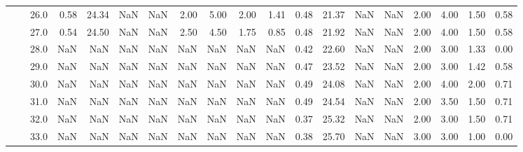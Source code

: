 \begin{tabular}{lllrrrrrrrrrrrrrrrr}
      &     & 26.0 &      0.58 &      24.34 &               NaN &                NaN & 2.00 &   5.00 &             2.00 &                         1.41 &      0.48 &      21.37 &               NaN &                NaN & 2.00 &   4.00 &             1.50 &                         0.58 \\
      &     & 27.0 &      0.54 &      24.50 &               NaN &                NaN & 2.50 &   4.50 &             1.75 &                         0.85 &      0.48 &      21.92 &               NaN &                NaN & 2.00 &   4.00 &             1.50 &                         0.58 \\
      &     & 28.0 &       NaN &        NaN &               NaN &                NaN &  NaN &    NaN &              NaN &                          NaN &      0.42 &      22.60 &               NaN &                NaN & 2.00 &   3.00 &             1.33 &                         0.00 \\
      &     & 29.0 &       NaN &        NaN &               NaN &                NaN &  NaN &    NaN &              NaN &                          NaN &      0.47 &      23.52 &               NaN &                NaN & 2.00 &   3.00 &             1.42 &                         0.58 \\
      &     & 30.0 &       NaN &        NaN &               NaN &                NaN &  NaN &    NaN &              NaN &                          NaN &      0.49 &      24.08 &               NaN &                NaN & 2.00 &   4.00 &             2.00 &                         0.71 \\
      &     & 31.0 &       NaN &        NaN &               NaN &                NaN &  NaN &    NaN &              NaN &                          NaN &      0.49 &      24.54 &               NaN &                NaN & 2.00 &   3.50 &             1.50 &                         0.71 \\
      &     & 32.0 &       NaN &        NaN &               NaN &                NaN &  NaN &    NaN &              NaN &                          NaN &      0.37 &      25.32 &               NaN &                NaN & 2.00 &   3.00 &             1.50 &                         0.71 \\
      &     & 33.0 &       NaN &        NaN &               NaN &                NaN &  NaN &    NaN &              NaN &                          NaN &      0.38 &      25.70 &               NaN &                NaN & 3.00 &   3.00 &             1.00 &                         0.00 \\

\end{tabular}
